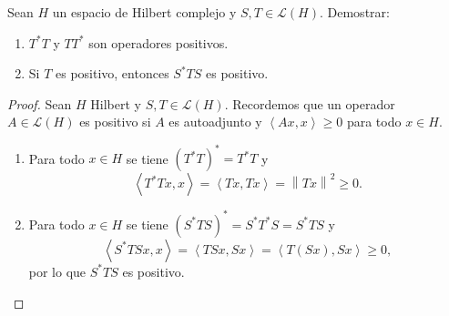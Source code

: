 \documentclass{article}
\theoremstyle{definition}
\newcommand{\norm}[1]{\left\lVert #1 \right\rVert}       %
\newcommand{\ip}[2]{\left\langle #1, #2 \right\rangle}   %
\newcommand{\LH}{\mathcal{L}(H)}                         %
\newenvironment{ejercicio}[1]{\begin{trivlist}
\item[\hskip \labelsep {\bfseries Ejercicio}\hskip \labelsep {\bfseries #1.}]}{\end{trivlist}}
\begin{document}
\begin{ejercicio}{2}
	Sean \( H \) un espacio de Hilbert complejo y \( S, T \in \LH \). Demostrar:
	\begin{enumerate}
		\item \( T^*T \) y \( TT^* \) son operadores positivos.
		\item Si \( T \) es positivo, entonces \( S^*TS \) es positivo.
	\end{enumerate}
\end{ejercicio}
\begin{proof}
	Sean \( H \) Hilbert y \( S, T \in \LH \). Recordemos que un operador \( A \in \LH \) es positivo si \( A \) es autoadjunto y \( \ip{Ax}{x} \ge 0 \) para todo \( x \in H \).
	\begin{enumerate}
		\item Para todo \( x \in H \) se tiene \( {(T^* T)}^* = T^* T \) y \[
			      \ip{T^*T x}{x} = \ip{Tx}{Tx} = \norm{Tx}^2 \ge 0.
		      \]
		\item Para todo \( x \in H \) se tiene \( {(S^*TS)}^* = S^*T^*S = S^*TS \) y
		      \[
			      \ip{S^*TS x}{x} = \ip{TSx}{Sx} = \ip{T(Sx)}{Sx} \ge 0,
		      \]
		      por lo que \( S^*TS \) es positivo.
	\end{enumerate}
\end{proof}

\vspace{0.5cm}
\end{document}
